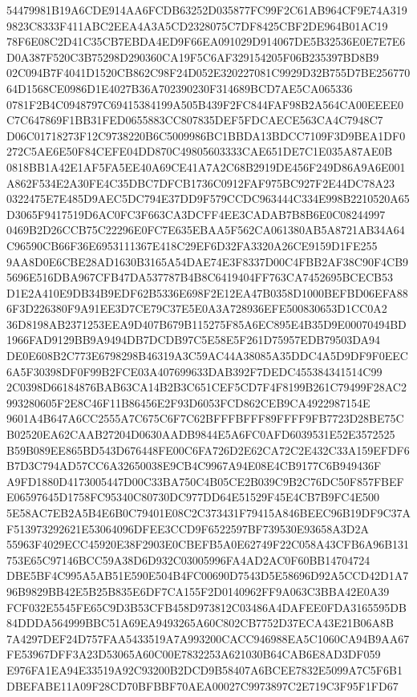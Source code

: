 \documentclass[UTF8,fontset=fandol,zihao=-4,a4paper]{ctexart}
\begin{document}
{{54479981B19A6CDE914AA6FCDB63252D035877FC99F2C61AB964CF9E74A3199823C8333F411ABC2EEA4A3A5CD2328075C7DF8425CBF2DE964B01AC19
78F6E08C2D41C35CB7EBDA4ED9F66EA091029D914067DE5B32536E0E7E7E6D0A387F520C3B75298D290360CA19F5C6AF329154205F06B235397BD8B9
02C094B7F4041D1520CB862C98F24D052E320227081C9929D32B755D7BE25677064D1568CE0986D1E4027B36A702390230F314689BCD7AE5CA065336
0781F2B4C0948797C69415384199A505B439F2FC844FAF98B2A564CA00EEEE0C7C647869F1BB31FED0655883CC807835DEF5FDCAECE563CA4C7948C7
D06C01718273F12C9738220B6C5009986BC1BBDA13BDCC7109F3D9BEA1DF0272C5AE6E50F84CEFE04DD870C49805603333CAE651DE7C1E035A87AE0B
0818BB1A42E1AF5FA5EE40A69CE41A7A2C68B2919DE456F249D86A9A6E001A862F534E2A30FE4C35DBC7DFCB1736C0912FAF975BC927F2E44DC78A23
0322475E7E485D9AEC5DC794E37DD9F579CCDC963444C334E998B2210520A65D3065F9417519D6AC0FC3F663CA3DCFF4EE3CADAB7B8B6E0C08244997
0469B2D26CCB75C22296E0FC7E635EBAA5F562CA061380AB5A8721AB34A64C96590CB66F36E6953111367E418C29EF6D32FA3320A26CE9159D1FE255
9AA8D0E6CBE28AD1630B3165A54DAE74E3F8337D00C4FBB2AF38C90F4CB95696E516DBA967CFB47DA537787B4B8C6419404FF763CA7452695BCECB53
D1E2A410E9DB34B9EDF62B5336E698F2E12EA47B0358D1000BEFBD06EFA886F3D226380F9A91EE3D7CE79C37E5E0A3A728936EFE500830653D1CC0A2
36D8198AB2371253EEA9D407B679B115275F85A6EC895E4B35D9E00070494BD1966FAD9129BB9A9494DB7DCDB97C5E58E5F261D75957EDB79503DA94
DE0E608B2C773E6798298B46319A3C59AC44A38085A35DDC4A5D9DF9F0EEC6A5F30398DF0F99B2FCE03A407699633DAB392F7DEDC455384341514C99
2C0398D66184876BAB63CA14B2B3C651CEF5CD7F4F8199B261C79499F28AC2993280605F2E8C46F11B86456E2F93D6053FCD862CEB9CA4922987154E
9601A4B647A6CC2555A7C675C6F7C62BFFFBFFF89FFFF9FB7723D28BE75CB02520EA62CAAB27204D0630AADB9844E5A6FC0AFD6039531E52E3572525
B59B089EE865BD543D676448FE00C6FA726D2E62CA72C2E432C33A159EFDF6B7D3C794AD57CC6A32650038E9CB4C9967A94E08E4CB9177C6B949436F
A9FD1880D4173005447D00C33BA750C4B05CE2B039C9B2C76DC50F857FBEFE06597645D1758FC95340C80730DC977DD64E51529F45E4CB7B9FC4E500
5E58AC7EB2A5B4E6B0C79401E08C2C373431F79415A846BEEC96B19DF9C37AF513973292621E53064096DFEE3CCD9F6522597BF739530E93658A3D2A
55963F4029ECC45920E38F2903E0CBEFB5A0E62749F22C058A43CFB6A96B131753E65C97146BCC59A38D6D932C03005996FA4AD2AC0F60BB14704724
DBE5BF4C995A5AB51E590E504B4FC00690D7543D5E58696D92A5CCD42D1A796B9829BB42E5B25B835E6DF7CA155F2D0140962FF9A063C3BBA42E0A39
FCF032E5545FE65C9D3B53CFB458D973812C03486A4DAFEE0FDA3165595DB84DDDA564999BBC51A69EA9493265A60C802CB7752D37ECA43E21B06A8B
7A4297DEF24D757FAA5433519A7A993200CACC946988EA5C1060CA94B9AA67FE53967DFF3A23D53065A60C00E7832253A621030B64CAB6E8AD3DF059
E976FA1EA94E33519A92C93200B2DCD9B58407A6BCEE7832E5099A7C5F6B1DBEFABE11A09F28CD70BFBBF70AEA00027C9973897C2E719C3F95F1FD67
}}
\end{document}
